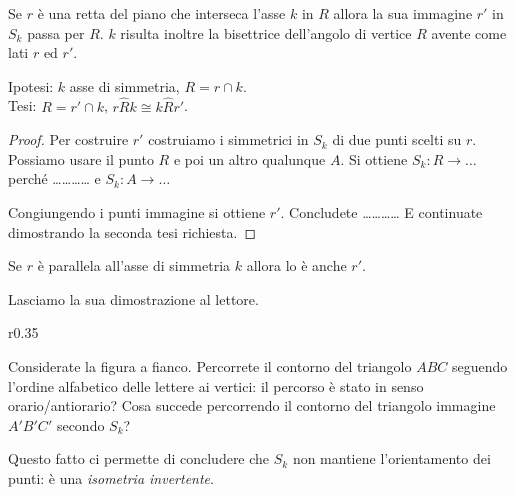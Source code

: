 \begin{teorema}\label{teo:8.4}
Se \(r\) è una retta del piano che interseca l'asse \(k\) in \(R\) allora 
la sua immagine \(r'\) in \(S_k\) passa per \(R\). \(k\) risulta inoltre la 
bisettrice dell'angolo di vertice \(R\) avente come lati \(r\) ed \(r'\).
\end{teorema}

\noindent\begin{minipage}{0.65\textwidth}\parindent15pt
\noindent Ipotesi: \(k\) asse di simmetria, \(R=r\cap k\).\\
Tesi: \(R=r'\cap k\), \(r\widehat{R}k\cong k\widehat{R}r'\).

\begin{proof}
Per costruire \(r'\) costruiamo i simmetrici in \(S_k\) di due punti 
scelti su \(r\). Possiamo usare il punto \(R\) e poi un altro qualunque 
\(A\). Si ottiene \(S_k: R \rightarrow \ldots{}\) perché 
\ldots\ldots\ldots\ldots{} e \(S_k: A \rightarrow \ldots{}\)

Congiungendo i punti immagine si ottiene \(r'\). Concludete 
\ldots\ldots\ldots\ldots{}
E continuate dimostrando la seconda tesi richiesta.
\end{proof}
\end{minipage}\hfil
\begin{minipage}{0.35\textwidth}
	\centering
\end{minipage}\vspace{5pt}

\begin{teorema}\label{teo:8.5}
Se \(r\) è parallela all'asse di simmetria \(k\) allora lo è anche \(r'\).
\end{teorema}

Lasciamo la sua dimostrazione al lettore.

\setlength{\intextsep}{3pt plus 2.0pt minus 2.0pt}
\begin{wrapfigure}{r}{0.35\textwidth}
	\centering
\end{wrapfigure}
Considerate la figura a fianco. Percorrete il contorno del triangolo 
\(ABC\) seguendo l'ordine alfabetico delle lettere ai vertici: il 
percorso è stato in senso orario/antiorario? Cosa succede percorrendo 
il contorno del triangolo immagine \(A'B'C'\) secondo \(S_k\)?

Questo fatto ci permette di concludere che \(S_k\) non mantiene 
l'orientamento dei punti: è una \emph{isometria invertente}.



